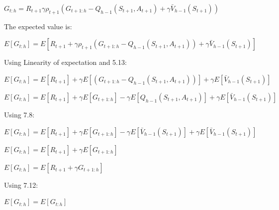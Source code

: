 \documentclass[11pt]{article}
\begin{document}
    \noindent $ G_{t:h} = R_{t+1} \gamma \rho_{t+1} ( G_{t+1:h} - Q_{h-1}(S_{t+1}, A_{t+1}) + \gamma \bar{V}_{h-1}(S_{t+1}) ) $

    \noindent The expected value is:

    \noindent $ E[G_{t:h}] = E [R_{t+1} + \gamma \rho_{t+1} ( G_{t+1:h} - Q_{h-1}(S_{t+1}, A_{t+1}) )+ \gamma \bar{V}_{h-1}(S_{t+1}) ] $

    \noindent Using Linearity of expectation and 5.13:

    \noindent $ E[G_{t:h}] = E [R_{t+1}] + \gamma E[( G_{t+1:h} - Q_{h-1}(S_{t+1}, A_{t+1}) )] + \gamma E[\bar{V}_{h-1}(S_{t+1})] $

    \noindent $ E[G_{t:h}] = E [R_{t+1}] + \gamma E[G_{t+1:h}] - \gamma E[Q_{h-1}(S_{t+1}, A_{t+1}) ] + \gamma E[\bar{V}_{h-1}(S_{t+1})] $

    \noindent Using 7.8:

    \noindent $ E[G_{t:h}] = E [R_{t+1}] + \gamma E[G_{t+1:h}] - \gamma E[\bar{V}_{h-1}(S_{t+1})] + \gamma E[\bar{V}_{h-1}(S_{t+1})] $

    \noindent $ E[G_{t:h}] = E [R_{t+1}] + \gamma E[G_{t+1:h}] $

    \noindent $ E[G_{t:h}] = E [R_{t+1} + \gamma G_{t+1:h}] $

    \noindent Using 7.12:

    \noindent $ E[G_{t:h}] = E[G_{t:h}] $
\end{document}
